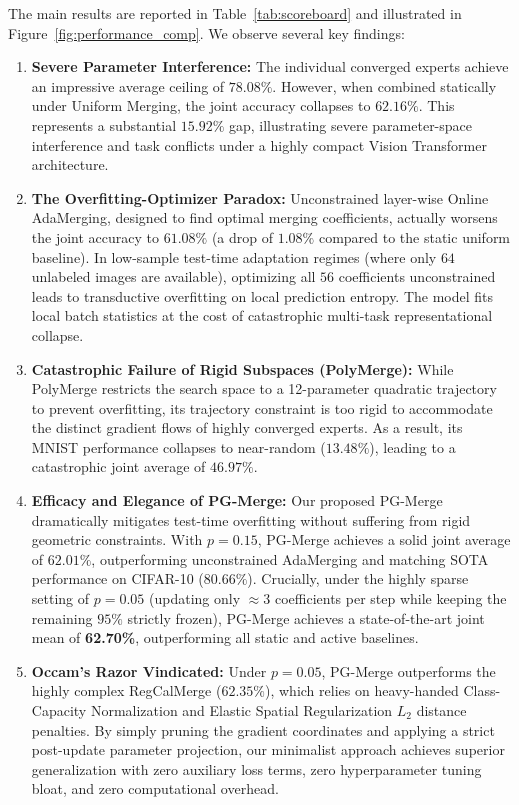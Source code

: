 The main results are reported in Table~\ref{tab:scoreboard} and illustrated in Figure~\ref{fig:performance_comp}. We observe several key findings:
\begin{enumerate}
    \item \textbf{Severe Parameter Interference:} The individual converged experts achieve an impressive average ceiling of $78.08\%$. However, when combined statically under Uniform Merging, the joint accuracy collapses to $62.16\%$. This represents a substantial $15.92\%$ gap, illustrating severe parameter-space interference and task conflicts under a highly compact Vision Transformer architecture.
    \item \textbf{The Overfitting-Optimizer Paradox:} Unconstrained layer-wise Online AdaMerging, designed to find optimal merging coefficients, actually worsens the joint accuracy to $61.08\%$ (a drop of $1.08\%$ compared to the static uniform baseline). In low-sample test-time adaptation regimes (where only $64$ unlabeled images are available), optimizing all $56$ coefficients unconstrained leads to transductive overfitting on local prediction entropy. The model fits local batch statistics at the cost of catastrophic multi-task representational collapse.
    \item \textbf{Catastrophic Failure of Rigid Subspaces (PolyMerge):} While PolyMerge restricts the search space to a 12-parameter quadratic trajectory to prevent overfitting, its trajectory constraint is too rigid to accommodate the distinct gradient flows of highly converged experts. As a result, its MNIST performance collapses to near-random ($13.48\%$), leading to a catastrophic joint average of $46.97\%$.
    \item \textbf{Efficacy and Elegance of PG-Merge:} Our proposed PG-Merge dramatically mitigates test-time overfitting without suffering from rigid geometric constraints. With $p=0.15$, PG-Merge achieves a solid joint average of $62.01\%$, outperforming unconstrained AdaMerging and matching SOTA performance on CIFAR-10 ($80.66\%$). Crucially, under the highly sparse setting of $p=0.05$ (updating only $\approx 3$ coefficients per step while keeping the remaining $95\%$ strictly frozen), PG-Merge achieves a state-of-the-art joint mean of \textbf{62.70\%}, outperforming all static and active baselines.
    \item \textbf{Occam's Razor Vindicated:} Under $p=0.05$, PG-Merge outperforms the highly complex RegCalMerge ($62.35\%$), which relies on heavy-handed Class-Capacity Normalization and Elastic Spatial Regularization $L_2$ distance penalties. By simply pruning the gradient coordinates and applying a strict post-update parameter projection, our minimalist approach achieves superior generalization with zero auxiliary loss terms, zero hyperparameter tuning bloat, and zero computational overhead.
\end{enumerate}

